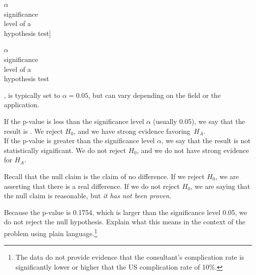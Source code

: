 $\alpha$\\\footnotesize significance\\level of a\\hypothesis test]{\raggedright\vspace{-4mm}

$\alpha$\\\footnotesize significance\\level of a\\hypothesis test}, is typically set to $\alpha = 0.05$, but can vary depending on the field or the application. %

\begin{termBox}{
If the p-value is less than the significance level $\alpha$ (usually 0.05), we say that the result is . We reject $H_0$, and we have strong evidence favoring~$H_A$. \\[2mm]
If the p-value is greater than the significance level $\alpha$, we say that the result is not statistically significant. We do not reject $H_0$, and we do not have strong evidence for $H_A$.}
\end{termBox}

Recall that the null claim is the claim of no difference. If we reject $H_0$, we are asserting that there is a real difference. If we do not reject $H_0$, we are saying that the null claim is reasonable, but \emph{it has not been proven}.

\begin{exercise} \label{plainLanguageExplanationOfHTConclusionForLiverDonorSurgicalConsultant}
Because the p-value is 0.1754, which is larger than the significance level 0.05, we do not reject the null hypothesis. Explain what this means in the context of the problem using plain language.\footnote{The data do not provide evidence that the consultant's complication rate is significantly lower or higher that the US complication rate of 10\%.}
\end{exercise}


